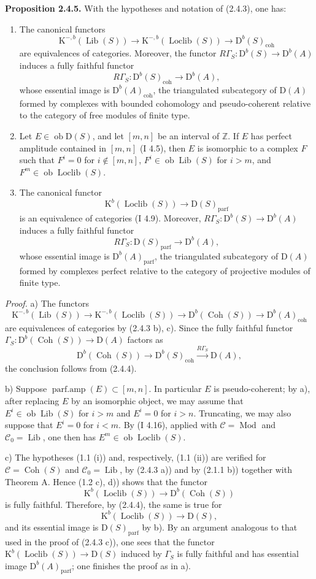 \documentclass[11pt]{article}
\providecommand{\Mod}{\operatorname{Mod}}
\providecommand{\Lib}{\operatorname{Lib}}
\providecommand{\Loclib}{\operatorname{Loclib}}
\providecommand{\Coh}{\operatorname{Coh}}
\providecommand{\Ob}{\operatorname{ob}}
\providecommand{\coh}{\operatorname{coh}}
\providecommand{\parf}{\operatorname{parf}}
\begin{document}
\textbf{Proposition 2.4.5.} With the hypotheses and notation of (2.4.3), one has:
\begin{enumerate}[label=\alph*)]
\item The canonical functors
\[
\mathrm K^{-,b}(\Lib(S))\longrightarrow\mathrm K^{-,b}(\Loclib(S))\longrightarrow \mathrm D^b(S)_{\coh}
\]
are equivalences of categories. Moreover, the functor $R\Gamma_S:\mathrm D^b(S)\to\mathrm D^b(A)$ induces a fully faithful functor
\[
R\Gamma_S:\mathrm D^b(S)_{\coh}\longrightarrow \mathrm D^b(A),
\]
whose essential image is $\mathrm D^b(A)_{\coh}$, the triangulated subcategory of $\mathrm D(A)$ formed by complexes with bounded cohomology and pseudo-coherent relative to the category of free modules of finite type.
\item Let $E\in\Ob\mathrm D(S)$, and let $[m,n]$ be an interval of $\mathbb Z$. If $E$ has perfect amplitude contained in $[m,n]$ (I 4.5), then $E$ is isomorphic to a complex $F$ such that $F^i=0$ for $i\notin[m,n]$, $F^i\in\Ob\Lib(S)$ for $i>m$, and $F^m\in\Ob\Loclib(S)$.
\item The canonical functor
\[
\mathrm K^b(\Loclib(S))\longrightarrow \mathrm D(S)_{\parf}
\]
is an equivalence of categories (I 4.9). Moreover, $R\Gamma_S:\mathrm D^b(S)\to\mathrm D^b(A)$ induces a fully faithful functor
\[
R\Gamma_S:\mathrm D(S)_{\parf}\longrightarrow\mathrm D^b(A),
\]
whose essential image is $\mathrm D^b(A)_{\parf}$, the triangulated subcategory of $\mathrm D(A)$ formed by complexes perfect relative to the category of projective modules of finite type.
\end{enumerate}

\emph{Proof.} a) The functors
\[
\mathrm K^{-,b}(\Lib(S))\longrightarrow\mathrm K^{-,b}(\Loclib(S))\longrightarrow
\mathrm D^b(\Coh(S))\longrightarrow\mathrm D^b(A)_{\coh}
\]
are equivalences of categories by (2.4.3 b), c). Since the fully faithful functor $\Gamma_S:\mathrm D^b(\Coh(S))\to\mathrm D(A)$ factors as
\[
\mathrm D^b(\Coh(S))\longrightarrow\mathrm D^b(S)_{\coh}\xrightarrow{R\Gamma_S}\mathrm D(A),
\]
the conclusion follows from (2.4.4).

b) Suppose $\operatorname{parf.amp}(E)\subset[m,n]$. In particular $E$ is pseudo-coherent; by a), after replacing $E$ by an isomorphic object, we may assume that $E^i\in\Ob\Lib(S)$ for $i>m$ and $E^i=0$ for $i>n$. Truncating, we may also suppose that $E^i=0$ for $i<m$. By (I 4.16), applied with $\mathcal C=\Mod$ and $\mathcal C_0=\Lib$, one then has $E^m\in\Ob\Loclib(S)$.

c) The hypotheses (1.1 (i)) and, respectively, (1.1 (ii)) are verified for $\mathcal C=\Coh(S)$ and $\mathcal C_0=\Lib$, by (2.4.3 a)) and by (2.1.1 b)) together with Theorem A. Hence (1.2 c), d)) shows that the functor
\[
\mathrm K^b(\Loclib(S))\longrightarrow\mathrm D^b(\Coh(S))
\]
is fully faithful. Therefore, by (2.4.4), the same is true for
\[
\mathrm K^b(\Loclib(S))\longrightarrow\mathrm D(S),
\]
and its essential image is $\mathrm D(S)_{\parf}$ by b). By an argument analogous to that used in the proof of (2.4.3 c)), one sees that the functor $\mathrm K^b(\Loclib(S))\to\mathrm D(S)$ induced by $\Gamma_S$ is fully faithful and has essential image $\mathrm D^b(A)_{\parf}$; one finishes the proof as in a).
\end{document}
